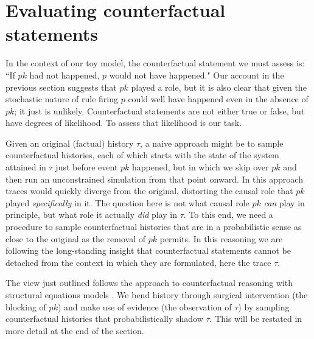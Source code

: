 
\newcommand{\PCFST}[0]{\mathbf{P}\left( \,\UPDATE{\tau}{[\iota]}
    \models \psi \,\right)}
\newcommand{\ItAbduction}[0]{(\textbf{abduction})}
\newcommand{\ItAction}[0]{(\textbf{action})}
\newcommand{\ItPrediction}[0]{(\textbf{prediction})}


\section{Evaluating counterfactual
  statements}\label{sec:counterfactual}


In the context of our toy model, the counterfactual statement we must
assess is: ``If $pk$ had not happened, $p$ would not have happened."
Our account in the previous section suggests that $pk$ played a role,
but it is also clear that given the stochastic nature of rule firing
$p$ could well have happened even in the absence of $pk$; it just is
unlikely. Counterfactual statements are not either true or false, but
have degrees of likelihood. To assess that likelihood is our task.

Given an original (factual) history $\tau$, a naive approach might be
to sample counterfactual histories, each of which starts with the
state of the system attained in $\tau$ just before event $pk$
happened, but in which we skip over $pk$ and then run an unconstrained
simulation from that point onward. In this approach traces would
quickly diverge from the original, distorting the causal role that
$pk$ played \emph{specifically} in it.  The question here is not what
causal role $pk$ \emph{can} play in principle, but what role it
actually \emph{did} play in $\tau$. To this end, we need a procedure
to sample counterfactual histories that are in a probabilistic sense
as close to the original as the removal of $pk$ permits. In this
reasoning we are following the long-standing insight
\cite{lewis1974causation,pearl2009causality} that counterfactual
statements cannot be detached from the context in which they are
formulated, here the trace $\tau$.

The view just outlined follows the approach to counterfactual
reasoning with structural equations models
\cite{pearl2009causality,woodward2003explanatory}. We bend history
through surgical intervention (the blocking of $pk$) and make use of
evidence (the observation of $\tau$) by sampling counterfactual
histories that probabilistically shadow $\tau$. This will be restated
in more detail at the end of the section.

